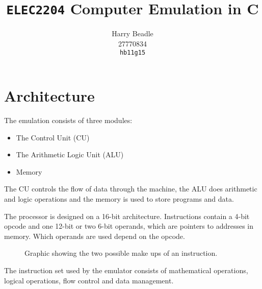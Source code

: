 \documentclass[a4paper]{article}
\title{\texttt{ELEC2204} Computer Emulation in C}
\author{Harry Beadle \\27770834\\\texttt{hb11g15}}
\begin{document}
\maketitle


\section{Architecture}

The emulation consists of three modules:

\begin{itemize}
    \item The Control Unit (CU)
    \item The Arithmetic Logic Unit (ALU)
    \item Memory
\end{itemize}

The CU controls the flow of data through the machine, the ALU does arithmetic and logic operations and the memory is used to store programs and data.

The processor is designed on a 16-bit architecture. Instructions contain a 4-bit opcode and one 12-bit or two 6-bit operands, which are pointers to addresses in memory. Which operands are used depend on the opcode.

\begin{figure}[H]
\centering
{}
\caption{Graphic showing the two possible make ups of an instruction.}
\end{figure}

The instruction set used by the emulator consists of mathematical operations, logical operations, flow control and data management.
\end{document}
